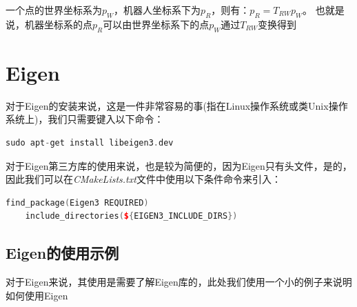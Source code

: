    一个点的世界坐标系为$p_W$，机器人坐标系下为$p_R$，则有：$p_R = T_{RW}p_W$。 也就是说，机器坐标系的点$p_R$可以由世界坐标系下的点$p_W$通过$T_{RW}$变换得到

\section{Eigen}

    对于Eigen的安装来说，这是一件非常容易的事(指在Linux操作系统或类Unix操作系统上)，我们只需要键入以下命令：

\begin{lstlisting}[language=C++]
    sudo apt-get install libeigen3.dev
\end{lstlisting}

    对于Eigen第三方库的使用来说，也是较为简便的，因为Eigen只有头文件，是的，因此我们可以在\emph{CMakeLists.txt}文件中使用以下条件命令来引入：

\begin{lstlisting}[language=C++]
    find_package(Eigen3 REQUIRED)
    include_directories(${EIGEN3_INCLUDE_DIRS})
\end{lstlisting}

\subsection{Eigen的使用示例}

    对于Eigen来说，其使用是需要了解Eigen库的，此处我们使用一个小的例子来说明如何使用Eigen

